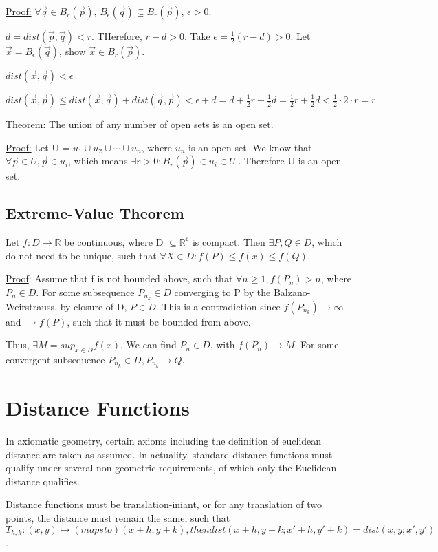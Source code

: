 \documentclass[11 pt, twoside]{article}
\begin{document}
\underline{Proof:} $\forall \vec{q} \in B_r(\vec{p})$, $B_\epsilon(\vec{q}) \subseteq
B_r(\vec{p})$, $\epsilon > 0$.

$d = dist(\vec{p}, \vec{q}) < r$. THerefore, $r - d > 0$. Take $\epsilon =
\frac{1}{2} (r - d) > 0$. Let $\vec{x} = B_\epsilon(\vec{q})$, show $\vec{x}
\in B_r(\vec{p})$.

$dist(\vec{x}, \vec{q}) < \epsilon$

$dist(\vec{x}, \vec{p}) \leq dist(\vec{x}, \vec{q}) + dist(\vec{q}, \vec{p}) <
\epsilon + d = d + \frac{1}{2} r - \frac{1}{2} d = \frac{1}{2}r +
\frac{1}{2}d < \frac{1}{2} \cdot 2 \cdot r = r$

\underline{Theorem:} The union of any number of open sets is an open set.

\underline{Proof:} Let U = $u_1 \cup u_2 \cup \cdots \cup u_n$, where $u_n$ is an open set. We know that $\forall \vec{p} \in U, \vec{p} \in u_i$, which means $\exists r > 0: B_r(\vec{p}) \in u_i \in U.$. Therefore U is an open set.

\subsection{Extreme-Value Theorem}
Let $f:D \to \mathbb{R}$ be continuous, where D $\subseteq \mathbb{R^d}$ is compact. Then $\exists P, Q \in D$, which do not need to be unique, such that $\forall X \in D: f(P) \leq f(x) \leq f(Q)$.

\underline{Proof}:
Assume that f is not bounded above, such that $\forall n \geq 1, f(P_n) > n$, where $P_n \in D$. For some subsequence $P_{n_k} \in D$ converging to P by the Balzano-Weirstrauss, by closure of D, $P \in D$. This is a contradiction since $f(P_{n_k}) \to \infty$ and $\to f(P)$, such that it must be bounded from above.

Thus, $\exists M = sup_{x \in D}f(x)$. We can find $P_n \in D$, with $f(P_n) \to M$. For some convergent subsequence $P_{n_k} \in D, P_{n_k} \to Q$.

\section{Distance Functions}
In axiomatic geometry, certain axioms including the definition of euclidean distance are taken as assumed. In actuality, standard distance functions must qualify under several non-geometric requirements, of which only the Euclidean distance qualifies.

Distance functions must be \underline{translation-iniant}, or for any translation of two points, the distance must remain the same, such that $T_{h, k}: (x, y) \mapsto (maps to) (x+h, y+k), then dist(x+h, y+k; x'+h, y'+k) = dist(x, y; x', y')$. 
\end{document}
